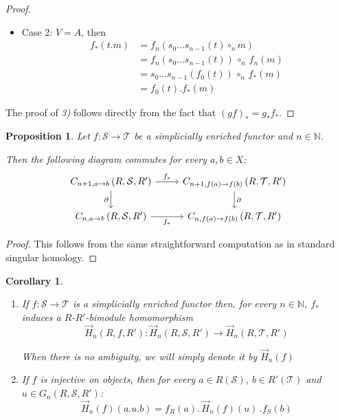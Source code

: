 \documentclass[a4paper,fleqn]{cas-sc}
\newtheorem{prop}[thm]{Proposition}%
\newtheorem{cor}[thm]{Corollary}
\newcommand{\G}{\Vec{H}}
\newcommand{\cS}{{\mathcal{S}}}
\newcommand{\cT}{{\mathcal{T}}}
\begin{document}
\begin{proof}
\begin{itemize}
    In that case $a.m = 0$ so $f_*(t.m) = 0$, and also $f(V) \neq f(A)$ by injectivity of $f$ so 
    \[ f_0 (t).f_*(m) = 0 = f_*(t.m)\]
    
    \item {Case 2:}
    $V = A$, then 
    \begin{align*} 
f_* (t.m) &= 
f_n ( s_0 \dots s_{n-1} (t) \circ_n m)
\\
&=  f_n ( s_0 \dots s_{n-1} (t)) \, \circ_n \, f_n(m)\\
&=  s_0 \dots s_{n-1} (f_0(t)) \, \circ_n \, f_*(m) \\
&= f_0(t). f_*(m) 
\end{align*}
\end{itemize}
The proof of \textit{3)} follows directly from the fact that $(gf)_* = g_* f_*$.
\end{proof}




\begin{prop}
Let $f : \cS \to \cT$ be a simplicially enriched functor and $n \in \mathbb{N}$.

Then the following diagram commutes for every $a,b \in X$:
\[\begin{tikzcd}
	C_{n+1, a \to b}\left(R, \cS, R'\right) 
	& C_{n+1, f(a) \to f(b)}\left(R, \cT, R'\right) \\
	C_{n, a \to b}\left(R, \cS, R'\right) 
	& C_{n, f(a) \to f(b)} \left(R, \cT, R'\right)
	\arrow["{f_*}", from=1-1, to=1-2]
	\arrow["\partial"', from=1-1, to=2-1]
	\arrow["\partial", from=1-2, to=2-2]
	\arrow["{f_*}"', from=2-1, to=2-2]
\end{tikzcd}\]

\end{prop}

\begin{proof}
This follows from the same straightforward computation as in standard singular homology.
\end{proof}

\begin{cor}
\label{cor:17}
\begin{enumerate}
    \item If $f : \cS \to \cT$ is a simplicially enriched functor then, for every $n \in \mathbb{N}$, $f_*$ induces a $R$-$R'$-bimodule homomorphism 
    \[\G_n(R, f, R') : \G_n(R, \cS, R') \to \G_n(R, \cT, R')\]
    
    When there is no ambiguity, we will simply denote it by $\G_n(f)$
    \item If $f$ is injective on objects, then for every $a \in R(\cS)$, $b \in R'(\cT)$ and $u \in G_n(R, \cS, R')$:
    \[ \G_n(f)(a.u.b) = f_R(a).\,\G_n(f)(u)\,.f_S(b)\]

\end{enumerate}
\end{cor}
\end{document}
